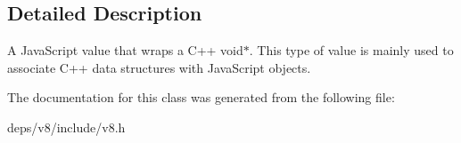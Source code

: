 \subsection{Detailed Description}
A Java\+Script value that wraps a C++ void$\ast$. This type of value is mainly used to associate C++ data structures with Java\+Script objects. 

The documentation for this class was generated from the following file\+:\begin{DoxyCompactItemize}
\item 
deps/v8/include/v8.\+h\end{DoxyCompactItemize}
